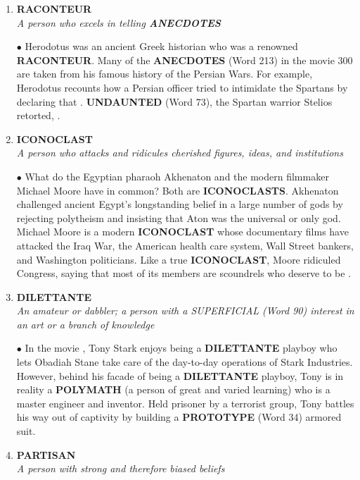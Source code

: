 \documentclass{book}
\begin{document}
\begin{enumerate}
\item \textbf{RACONTEUR}\\
\textit{A person who excels in telling \textbf{ANECDOTES}}

$ \bullet $ Herodotus was an ancient Greek historian who was a
renowned \textbf{RACONTEUR}. Many of the \textbf{ANECDOTES}
(Word 213) in the movie 300 are taken from his
famous history of the Persian Wars. For example,
Herodotus recounts how a Persian officer tried to
intimidate the Spartans by declaring that . \textbf{UNDAUNTED}
(Word 73), the Spartan warrior Stelios retorted, .

\item\textbf{ICONOCLAST}\\
\textit{A person who attacks and ridicules cherished
figures, ideas, and institutions}

$ \bullet $ What do the Egyptian pharaoh Akhenaton and the
modern filmmaker Michael Moore have in common? Both are \textbf{ICONOCLASTS}. Akhenaton challenged
ancient Egypt's longstanding belief in a large number
of gods by rejecting polytheism and insisting that
Aton was the universal or only god. Michael Moore is
a modern \textbf{ICONOCLAST} whose documentary films
have attacked the Iraq War, the American health care
system, Wall Street bankers, and Washington
politicians. Like a true \textbf{ICONOCLAST}, Moore
ridiculed Congress, saying that most of its members
are scoundrels who deserve to be .

\item\textbf{DILETTANTE}\\
\textit{An amateur or dabbler; a person with a
SUPERFICIAL (Word 90) interest in an art or
a branch of knowledge}

$ \bullet $ In the movie , Tony Stark enjoys being a
\textbf{DILETTANTE} playboy who lets Obadiah Stane take
care of the day-to-day operations of Stark Industries.
However, behind his facade of being a \textbf{DILETTANTE}
playboy, Tony is in reality a \textbf{POLYMATH} (a person of
great and varied learning) who is a master engineer
and inventor. Held prisoner by a terrorist group, Tony
battles his way out of captivity by building a
\textbf{PROTOTYPE} (Word 34) armored suit.

\item\textbf{PARTISAN}\\
\textit{A person with strong and therefore biased
beliefs}


\end{enumerate}
\end{document}
